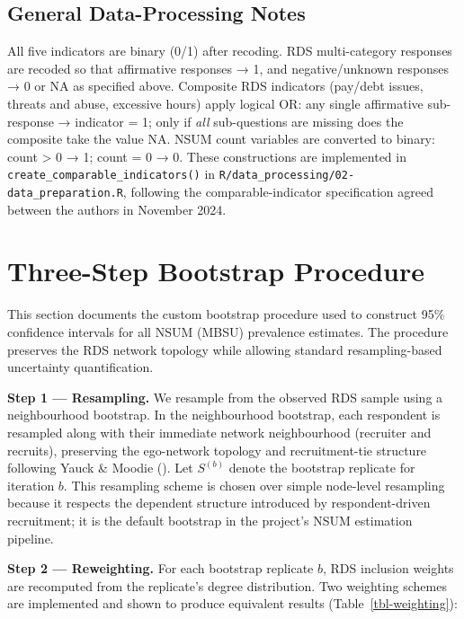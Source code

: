 \documentclass[
  12pt,
  letterpaper,
  DIV=11,
  numbers=noendperiod]{scrreprt}
\begin{document}
\section{General Data-Processing Notes}\label{sec-b-notes}

All five indicators are binary (0/1) after recoding. RDS multi-category
responses are recoded so that affirmative responses → 1, and
negative/unknown responses → 0 or NA as specified above. Composite RDS
indicators (pay/debt issues, threats and abuse, excessive hours) apply
logical OR: any single affirmative sub-response → indicator = 1; only if
\emph{all} sub-questions are missing does the composite take the value
NA. NSUM count variables are converted to binary: count \textgreater{} 0
→ 1; count = 0 → 0. These constructions are implemented in
\texttt{create\_comparable\_indicators()} in
\texttt{R/data\_processing/02-data\_preparation.R}, following the
comparable-indicator specification agreed between the authors in
November 2024.

\chapter{Three-Step Bootstrap Procedure}\label{sec-c}

This section documents the custom bootstrap procedure used to construct
95\% confidence intervals for all NSUM (MBSU) prevalence estimates. The
procedure preserves the RDS network topology while allowing standard
resampling-based uncertainty quantification.

\textbf{Step 1 --- Resampling.} We resample from the observed RDS sample
using a neighbourhood bootstrap. In the neighbourhood bootstrap, each
respondent is resampled along with their immediate network neighbourhood
(recruiter and recruits), preserving the ego-network topology and
recruitment-tie structure following Yauck \& Moodie
(). Let \(S^{(b)}\) denote the
bootstrap replicate for iteration \(b\). This resampling scheme is
chosen over simple node-level resampling because it respects the
dependent structure introduced by respondent-driven recruitment; it is
the default bootstrap in the project's NSUM estimation pipeline.

\textbf{Step 2 --- Reweighting.} For each bootstrap replicate \(b\), RDS
inclusion weights are recomputed from the replicate's degree
distribution. Two weighting schemes are implemented and shown to produce
equivalent results (Table~\ref{tbl-weighting}):
\end{document}
